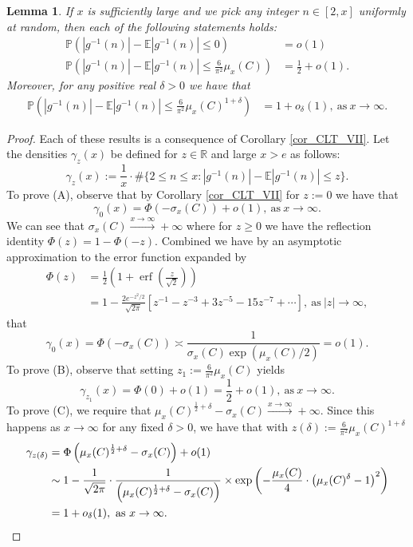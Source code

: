 \documentclass[11pt,reqno,a4letter]{article}
\numberwithin{figure}{section}
\numberwithin{table}{section}
\theoremstyle{plain}
\newtheorem{lemma}[theorem]{Lemma}
\numberwithin{theorem}{section}
\theoremstyle{definition}
\begin{document}
\begin{lemma} 
\label{lemma_ProbsOfAbsgInvnDist_v2} 
If $x$ is sufficiently large and we pick any integer $n \in [2, x]$ uniformly at random, then 
each of the following statements holds: 
\begin{align*} 
\tag{A}
\mathbb{P}\left(|g^{-1}(n)| - \mathbb{E}|g^{-1}(n)| \leq 0\right) & = o(1) \\ 
\tag{B} 
\mathbb{P}\left(|g^{-1}(n)| - \mathbb{E}|g^{-1}(n)| \leq \frac{6}{\pi^2} \mu_x(C)\right) & = 
     \frac{1}{2} + o(1). 
\end{align*} 
Moreover, for any positive real $\delta > 0$ we have that 
\begin{align*} 
\tag{C} 
\mathbb{P}\left(|g^{-1}(n)| - \mathbb{E}|g^{-1}(n)| \leq \frac{6}{\pi^2} \mu_x(C)^{1 + \delta}\right) & = 
     1 + o_{\delta}(1), 
     \mathrm{\ as\ } x \rightarrow \infty. 
\end{align*} 
\end{lemma} 
\begin{proof} 
Each of these results is a consequence of Corollary \ref{cor_CLT_VII}. 
Let the densities $\gamma_z(x)$ be defined for $z \in \mathbb{R}$ and 
large $x > e$ as follows: 
\[
\gamma_z(x) := \frac{1}{x} \cdot \#\{2 \leq n \leq x: |g^{-1}(n)| - \mathbb{E}|g^{-1}(n)| \leq z\}. 
\]
To prove (A), observe that by Corollary \ref{cor_CLT_VII} for $z := 0$ we have that 
\[
\gamma_0(x) = \Phi\left(-\sigma_x(C)\right) + o(1), \mathrm{\ as\ } x \rightarrow \infty. 
\]
We can see that $\sigma_x(C) \xrightarrow{x \rightarrow \infty} +\infty$ where for $z \geq 0$ we have the 
reflection identity $\Phi(z) = 1 - \Phi(-z)$. Combined we have by an asymptotic approximation 
to the error function expanded by 
\begin{align*} 
\Phi(z) & = \frac{1}{2}\left(1 + \operatorname{erf}\left(\frac{z}{\sqrt{2}}\right)\right) \\ 
     & = 1 - \frac{2e^{-z^2/2}}{\sqrt{2\pi}}\left[ 
     z^{-1} - z^{-3} + 3z^{-5} - 15z^{-7} + \cdots 
     \right], \mathrm{\ as\ } |z| \rightarrow \infty, 
\end{align*} 
that 
\[
\gamma_0(x) = \Phi\left(-\sigma_x(C)\right) \asymp \frac{1}{\sigma_x(C) \exp(\mu_x(C)/2)} = o(1). 
\]
To prove (B), observe that setting $z_1 := \frac{6}{\pi^2} \mu_x(C)$ yields 
\[
\gamma_{z_1}(x) = \Phi(0) + o(1) = \frac{1}{2} + o(1), \mathrm{\ as\ } x \rightarrow \infty. 
\]
To prove (C), we require that 
$\mu_x(C)^{\frac{1}{2} + \delta} - \sigma_x(C) \xrightarrow{x \rightarrow \infty} +\infty$. 
Since this happens as $x \rightarrow \infty$ for any fixed $\delta > 0$, we have that 
with $z(\delta) := \frac{6}{\pi^2} \mu_x(C)^{1 + \delta}$ 
\begin{align*} 
\gamma_{z(\delta)} & = \Phi\left(\mu_x(C)^{\frac{1}{2} + \delta} - \sigma_x(C)\right) + o(1) \\ 
     & \sim 1 - \frac{1}{\sqrt{2\pi}} \cdot \frac{1}{\left(\mu_x(C)^{\frac{1}{2} + \delta} - \sigma_x(C)\right)} \times 
     \exp\left(-\frac{\mu_x(C)}{4} \cdot \left(\mu_x(C)^{\delta} - 1\right)^2\right) \\ 
     & = 1 + o_{\delta}(1), \mathrm{\ as\ } x \rightarrow \infty. 
     \qedhere 
\end{align*} 
\end{proof} 
\end{document}
